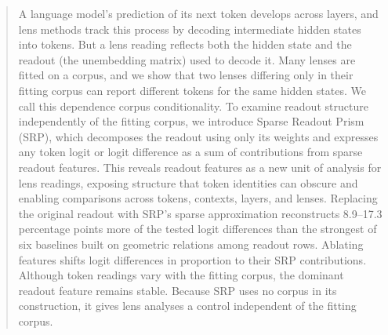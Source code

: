 \begin{abstract}
A language model's prediction of its next token develops across layers,
and lens methods track this process by decoding intermediate hidden states
into tokens. But a lens reading reflects both the hidden state and the
readout (the unembedding matrix) used to decode it. Many lenses are fitted on
a corpus, and we show that two lenses differing only in their fitting
corpus can report different tokens for the same hidden states. We call
this dependence corpus conditionality. To examine readout structure
independently of the fitting corpus, we introduce Sparse Readout Prism
(SRP), which decomposes the readout using only its weights and expresses
any token logit or logit difference as a sum of contributions from sparse
readout features. This reveals readout features as a new unit of analysis
for lens readings, exposing structure that token identities can obscure
and enabling comparisons across tokens, contexts, layers, and lenses.
Replacing the original readout with SRP's sparse approximation
reconstructs 8.9--17.3 percentage points more of the tested logit
differences than the strongest of six baselines built on geometric
relations among readout rows. Ablating features shifts logit differences in proportion to their SRP
contributions. Although token readings vary with the fitting
corpus, the dominant readout feature remains stable. Because SRP uses no
corpus in its construction, it gives lens analyses a control independent
of the fitting corpus.
\end{abstract}
